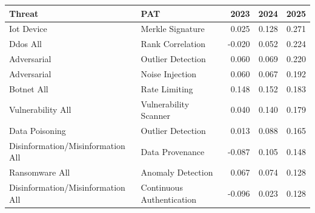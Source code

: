\begin{tabular}{llrrr}
\toprule
Threat & PAT & 2023 & 2024 & 2025 \\
\midrule
Iot Device & Merkle Signature & 0.025 & 0.128 & 0.271 \\
Ddos All & Rank Correlation & -0.020 & 0.052 & 0.224 \\
Adversarial & Outlier Detection & 0.060 & 0.069 & 0.220 \\
Adversarial & Noise Injection & 0.060 & 0.067 & 0.192 \\
Botnet All & Rate Limiting & 0.148 & 0.152 & 0.183 \\
Vulnerability All & Vulnerability Scanner & 0.040 & 0.140 & 0.179 \\
Data Poisoning & Outlier Detection & 0.013 & 0.088 & 0.165 \\
Disinformation/Misinformation All & Data Provenance & -0.087 & 0.105 & 0.148 \\
Ransomware All & Anomaly Detection & 0.067 & 0.074 & 0.128 \\
Disinformation/Misinformation All & Continuous Authentication & -0.096 & 0.023 & 0.128 \\
\bottomrule
\end{tabular}

